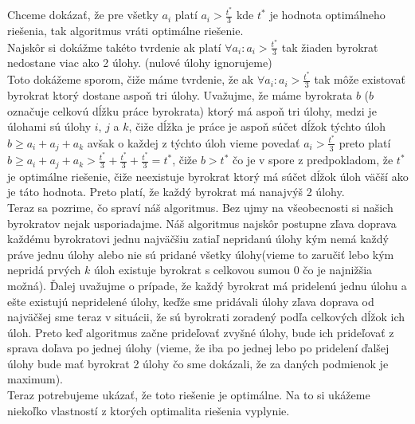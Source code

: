 \documentclass[a4paper]{article}
\begin{document}
Chceme dokázať, že pre všetky $a_i$ platí $a_i > \frac{t^*}{3}$ kde $t^*$ je hodnota optimálneho riešenia, tak algoritmus vráti optimálne riešenie.
\\

Najskôr si dokážme takéto tvrdenie ak platí $\forall a_i: a_i > \frac{t^*}{3}$ tak žiaden byrokrat nedostane viac ako 2 úlohy. (nulové úlohy ignorujeme)
\\

Toto dokážeme sporom, čiže máme tvrdenie, že ak $\forall a_i: a_i > \frac{t^*}{3}$ tak môže existovať byrokrat ktorý dostane aspoň tri úlohy.
Uvažujme, že máme byrokrata $b$ ($b$ označuje celkovú dĺžku práce byrokrata) ktorý má aspoň tri úlohy, medzi je úlohami sú úlohy $i$, $j$ a $k$, čiže dĺžka je práce je aspoň súčet dĺžok týchto úloh $b \geq a_i + a_j + a_k$ avšak o každej z týchto úloh vieme povedať $a_i > \frac{t^*}{3}$ preto platí $b \geq a_i + a_j + a_k > \frac{t^*}{3} + \frac{t^*}{3} +\frac{t^*}{3} = t^*$, čiže $b > t^*$ čo je v spore z predpokladom, že $t^*$ je optimálne riešenie, čiže neexistuje byrokrat ktorý má súčet dĺžok úloh väčší ako je táto hodnota. Preto platí, že každý byrokrat má nanajvýš 2 úlohy.
\\

Teraz sa pozrime, čo spraví náš algoritmus. Bez ujmy na všeobecnosti si našich byrokratov nejak usporiadajme. Náš algoritmus najskôr postupne zľava doprava každému byrokratovi jednu najväčšiu zatiaľ nepridanú úlohy kým nemá každý práve jednu úlohy alebo nie sú pridané všetky úlohy(vieme to zaručiť lebo kým nepridá prvých $k$ úloh existuje byrokrat s celkovou sumou 0 čo je najnižšia možná). Ďalej uvažujme o prípade, že každý byrokrat má pridelenú jednu úlohu a ešte existujú nepridelené úlohy, keďže sme pridávali úlohy zľava doprava od najväčšej sme teraz v situácii, že sú byrokrati zoradený podľa celkových dĺžok ich úloh. Preto keď algoritmus začne prideľovať zvyšné úlohy, bude ich prideľovať z sprava doľava po jednej úlohy (vieme, že iba po jednej lebo po pridelení ďalšej úlohy bude mať byrokrat 2 úlohy čo sme dokázali, že za daných podmienok je maximum). 
\\

Teraz potrebujeme ukázať, že toto riešenie je optimálne. Na to si ukážeme niekoľko vlastností z ktorých optimalita riešenia vyplynie.
\end{document}
